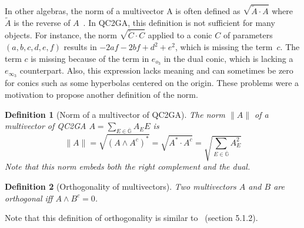 \documentclass{birkjour}
\newtheorem{definition}{Definition}
\begin{document}
In other algebras, the norm of a multivector A is often defined as \(\sqrt{\tilde A \cdot A}\) where $\tilde A$ is the reverse of $A$~\cite{dorst_geometric_2010}. In QC2GA, this definition is not sufficient for many objects. For instance, the norm \(\sqrt{\tilde C \cdot C}\) applied to a conic \(C\) of parameters \((a,b,c,d,e,f)\) results in \( -2 a f - 2 b f + d^2 + e^2\), which is missing the term~\(c\). The term \(c\) is missing because of the term in \(e_{o_3}\) in the dual conic, which is lacking a \(e_{\infty_3}\) counterpart. Also, this expression lacks meaning and can sometimes be zero for conics such as some hyperbolas centered on the origin. These problems were a motivation to propose another definition of the norm.


\begin{definition}[Norm of a multivector of QC2GA]
    The norm \(\|A\|\) of a multivector of QC2GA \(A=\sum_{E\in\overline{\mathbb{G}}} A_E E\) is  
    \begin{equation}
        \|A\| = \sqrt{\left(A \wedge A^c\right)^*}= \sqrt{A^* \cdot A^c} = \sqrt{\sum_{E\in\overline{\mathbb{G}}} A_E^2}
    \end{equation}
Note that this norm embeds both the right complement and the dual.
\end{definition}


\begin{definition}[Orthogonality of multivectors] \label{def:orthogonalconics}
    Two multivectors \(A\) and \(B\) are orthogonal iff \(A \wedge B^c = 0\).
\end{definition}
\noindent Note that this definition of orthogonality is similar to~\cite{gunn2022bit} (section 5.1.2).

    
\end{document}
